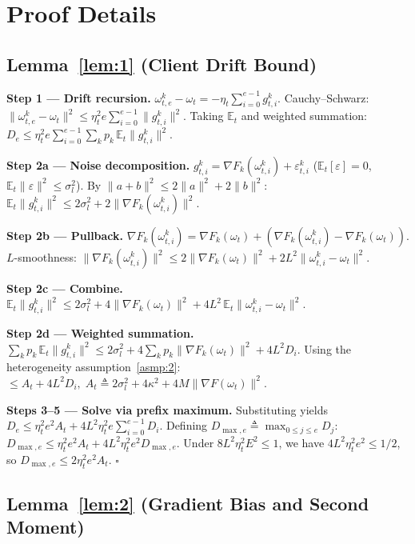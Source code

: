 \appendix
\section{Proof Details}\label{app:B}
\subsection*{Lemma~\ref{lem:1} (Client Drift Bound)}

\noindent\textbf{Step 1 --- Drift recursion.}
\(\omega_{t,e}^k - \omega_t = -\eta_t\sum_{i=0}^{e-1}g_{t,i}^k\).
Cauchy--Schwarz:
\(\|\omega_{t,e}^k - \omega_t\|^2 \le \eta_t^2 e\sum_{i=0}^{e-1}\|g_{t,i}^k\|^2\).
Taking \(\mathbb E_t\) and weighted summation:
\(D_e \le \eta_t^2 e\sum_{i=0}^{e-1}\sum_k p_k\,\mathbb E_t\|g_{t,i}^k\|^2\).

\noindent\textbf{Step 2a --- Noise decomposition.}
\(g_{t,i}^k = \nabla F_k(\omega_{t,i}^k) + \varepsilon_{t,i}^k\)
(\(\mathbb E_t[\varepsilon] = 0\), \(\mathbb E_t\|\varepsilon\|^2 \le \sigma_l^2\)).
By \(\|a+b\|^2 \le 2\|a\|^2 + 2\|b\|^2\):
\(\mathbb E_t\|g_{t,i}^k\|^2 \le 2\sigma_l^2 + 2\|\nabla F_k(\omega_{t,i}^k)\|^2\).

\noindent\textbf{Step 2b --- Pullback.}
\(\nabla F_k(\omega_{t,i}^k) = \nabla F_k(\omega_t) + (\nabla F_k(\omega_{t,i}^k) - \nabla F_k(\omega_t))\).
\(L\)-smoothness:
\(\|\nabla F_k(\omega_{t,i}^k)\|^2 \le 2\|\nabla F_k(\omega_t)\|^2 + 2L^2\|\omega_{t,i}^k - \omega_t\|^2\).

\noindent\textbf{Step 2c --- Combine.}
\(\mathbb E_t\|g_{t,i}^k\|^2 \le 2\sigma_l^2 + 4\|\nabla F_k(\omega_t)\|^2 + 4L^2\,\mathbb E_t\|\omega_{t,i}^k - \omega_t\|^2\).

\noindent\textbf{Step 2d --- Weighted summation.}
\(\sum_k p_k\,\mathbb E_t\|g_{t,i}^k\|^2
 \le 2\sigma_l^2 + 4\sum_k p_k\|\nabla F_k(\omega_t)\|^2 + 4L^2 D_i\).
Using the heterogeneity assumption~\ref{asmp:2}:
\(\le A_t + 4L^2 D_i,\; A_t \triangleq 2\sigma_l^2 + 4\kappa^2 + 4M\|\nabla F(\omega_t)\|^2\).

\noindent\textbf{Steps 3--5 --- Solve via prefix maximum.}
Substituting yields \(D_e \le \eta_t^2 e^2 A_t + 4L^2\eta_t^2 e\sum_{i=0}^{e-1}D_i\).
Defining \(D_{\max,e} \triangleq \max_{0\le j\le e} D_j\):
\(D_{\max,e} \le \eta_t^2 e^2 A_t + 4L^2\eta_t^2 e^2 D_{\max,e}\).
Under \(8L^2\eta_t^2 E^2 \le 1\), we have \(4L^2\eta_t^2 e^2 \le 1/2\),
so \(D_{\max,e} \le 2\eta_t^2 e^2 A_t\). \(\square\)

\subsection*{Lemma~\ref{lem:2} (Gradient Bias and Second Moment)}

